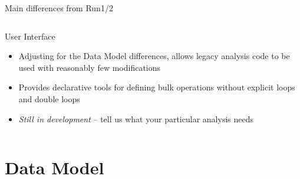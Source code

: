 \documentclass[10pt,lualatex,xcolor={table,svgnames},{hyperref={bookmarks=true,linktoc=all}},aspectratio=169]{beamer}
\begin{document}
\begin{frame}[shrink=14]{Main differences from Run1/2}
\begin{columns}
\begin{column}{0.32\textwidth}
\begin{block}{User Interface}
\begin{itemize}
                    \item Adjusting for the Data Model differences, allows legacy analysis code to be used with reasonably few modifications
                    \item Provides declarative tools for defining bulk operations without explicit loops and double loops
                    \item \emph{Still in development} -- tell us what your particular analysis needs
                \end{itemize}
                \smallskip
            \end{block}
        \end{column}
    \end{columns}
\end{frame}

\section{Data Model}
\end{document}
